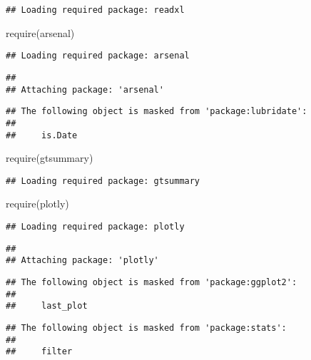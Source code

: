 \documentclass[
]{article}
\newenvironment{Shaded}{\begin{snugshade}}{\end{snugshade}}
\newcommand{\FunctionTok}[1]{\textcolor[rgb]{0.00,0.00,0.00}{#1}}
\newcommand{\NormalTok}[1]{#1}
\begin{document}
\begin{verbatim}
## Loading required package: readxl
\end{verbatim}

\begin{Shaded}
\begin{Highlighting}[]
\FunctionTok{require}\NormalTok{(arsenal)}
\end{Highlighting}
\end{Shaded}

\begin{verbatim}
## Loading required package: arsenal
\end{verbatim}

\begin{verbatim}
## 
## Attaching package: 'arsenal'
\end{verbatim}

\begin{verbatim}
## The following object is masked from 'package:lubridate':
## 
##     is.Date
\end{verbatim}

\begin{Shaded}
\begin{Highlighting}[]
\FunctionTok{require}\NormalTok{(gtsummary)}
\end{Highlighting}
\end{Shaded}

\begin{verbatim}
## Loading required package: gtsummary
\end{verbatim}

\begin{Shaded}
\begin{Highlighting}[]
\FunctionTok{require}\NormalTok{(plotly)}
\end{Highlighting}
\end{Shaded}

\begin{verbatim}
## Loading required package: plotly
\end{verbatim}

\begin{verbatim}
## 
## Attaching package: 'plotly'
\end{verbatim}

\begin{verbatim}
## The following object is masked from 'package:ggplot2':
## 
##     last_plot
\end{verbatim}

\begin{verbatim}
## The following object is masked from 'package:stats':
## 
##     filter
\end{verbatim}
\end{document}
